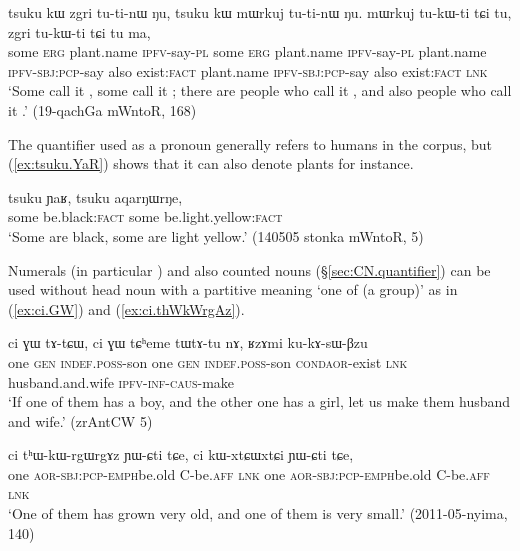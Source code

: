 \begin{exe}
\ex \label{ex:zgri.mWrkuj}
\gll tsuku kɯ zgri tu-ti-nɯ ŋu, tsuku kɯ mɯrkuj tu-ti-nɯ ŋu. mɯrkuj tu-kɯ-ti tɕi tu, zgri tu-kɯ-ti tɕi tu ma, \\
some \textsc{erg} plant.name \textsc{ipfv}-say-\textsc{pl} some \textsc{erg} plant.name \textsc{ipfv}-say-\textsc{pl} plant.name  \textsc{ipfv}-\textsc{sbj}:\textsc{pcp}-say also exist:\textsc{fact} plant.name  \textsc{ipfv}-\textsc{sbj}:\textsc{pcp}-say also exist:\textsc{fact}  \textsc{lnk} \\
\glt  `Some call it , some call it ; there are people who call it , and also people who call it .' (19-qachGa mWntoR, 168)
\end{exe}
 
The quantifier  used as a pronoun generally refers to humans in the corpus, but (\ref{ex:tsuku.YaR}) shows that it can also denote plants for instance. 

\begin{exe}
\ex \label{ex:tsuku.YaR}
\gll tsuku ɲaʁ, tsuku aqarŋɯrŋe, \\
some be.black:\textsc{fact} some be.light.yellow:\textsc{fact} \\
\glt `Some are black, some are light yellow.' (140505 stonka mWntoR, 5)
\end{exe}

Numerals (in particular ) and also counted nouns (§\ref{sec:CN.quantifier}) can be used without head noun with a partitive meaning `one of (a group)' as in (\ref{ex:ci.GW})  and (\ref{ex:ci.thWkWrgAz}).

\begin{exe}
\ex \label{ex:ci.GW}
\gll ci ɣɯ 	tɤ-tɕɯ,  ci ɣɯ tɕʰeme tɯ\redp{}tɤ-tu nɤ, ʁzɤmi ku-kɤ-sɯ-βzu \\
one \textsc{gen} \textsc{indef}.\textsc{poss}-son one \textsc{gen} \textsc{indef}.\textsc{poss}-son \textsc{cond}\redp{}\textsc{aor}-exist \textsc{lnk} husband.and.wife \textsc{ipfv}-\textsc{inf}-\textsc{caus}-make \\
\glt `If one of them has a boy, and the other one has a girl, let us make them husband and wife.' (zrAntCW 5)
\end{exe}

\begin{exe}
\ex \label{ex:ci.thWkWrgAz}
\gll ci tʰɯ-kɯ-rgɯ\redp{}rgɤz ɲɯ-ɕti tɕe, ci kɯ-xtɕɯ\redp{}xtɕi ɲɯ-ɕti tɕe, \\
one \textsc{aor}-\textsc{sbj}:\textsc{pcp}-\textsc{emph}\redp{}be.old C-be.\textsc{aff} \textsc{lnk} one \textsc{aor}-\textsc{sbj}:\textsc{pcp}-\textsc{emph}\redp{}be.old C-be.\textsc{aff} \textsc{lnk}  \\
\glt `One of them has grown very old, and one of them is very small.' (2011-05-nyima, 140)
\end{exe}

